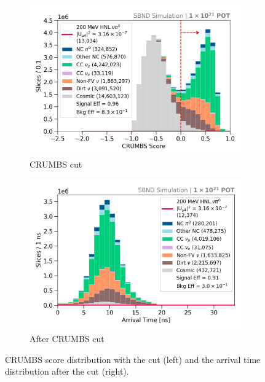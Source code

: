 \begin{figure}[ht!]
        \begin{subfigure}[b]{0.495\textwidth}   
            \centering 
            \includegraphics[width=\textwidth]{crumbs_precut}
            \caption{CRUMBS cut}%
            \label{fig:crumbs_cut}
        \end{subfigure}
        \hfill
        \begin{subfigure}[b]{0.495\textwidth}   
            \centering 
            \includegraphics[width=\textwidth]{beam_bucket_post_crumbs}
            \caption{After CRUMBS cut}%
            \label{fig:bb_crumbs}
        \end{subfigure}
	\caption[CRUMBS Cut]{
		CRUMBS score distribution with the cut (left) and the arrival time distribution after the cut (right). 
	}
        \label{fig:cosmic_crumbs_cut}
\end{figure}


